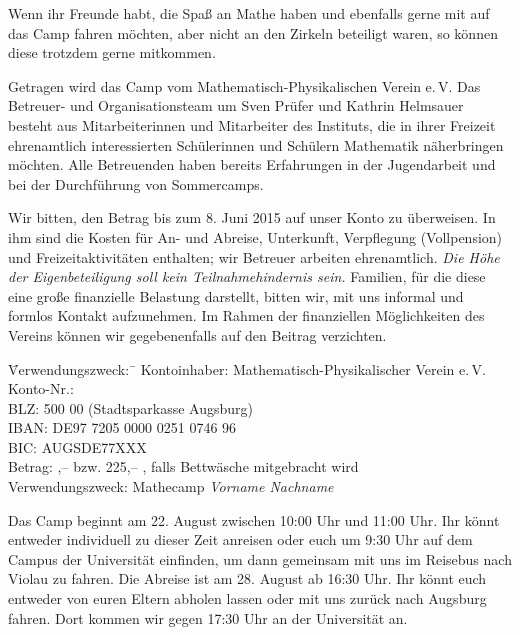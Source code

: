 \documentclass[12pt]{zettel}
\begin{document}
\begin{minipage}{0.44\textwidth}
Wenn ihr Freunde
habt, die Spaß an Mathe haben und ebenfalls gerne mit auf das
Camp fahren möchten, aber nicht an den Zirkeln beteiligt waren, so
können diese trotzdem gerne mitkommen.
\end{minipage}

\newpage

Getragen wird das Camp vom Mathematisch-Physikalischen Verein e.\,V. Das
Betreuer- und Organisationsteam um Sven Prüfer und Kathrin Helmsauer besteht
aus Mitarbeiterinnen und Mitarbeiter des Instituts, die in ihrer Freizeit
ehrenamtlich interessierten Schülerinnen und Schülern Mathematik näherbringen
möchten. Alle Betreuenden haben
bereits Erfahrungen in der Jugendarbeit und bei der Durch\-füh\-rung von
Sommercamps.

Wir bitten, den Betrag bis zum 8. Juni 2015 auf unser Konto zu überweisen.
In ihm sind die Kosten für An- und Abreise, Unterkunft, Verpflegung
(Vollpension) und Freizeitaktivitäten enthalten; wir Betreuer arbeiten
ehrenamtlich. \emph{Die Höhe der Eigenbeteiligung soll kein Teilnahmehindernis sein.}
Familien, für die diese eine große finanzielle Belastung darstellt, bitten wir,
mit uns informal und formlos Kontakt aufzunehmen. Im Rahmen der finanziellen Möglichkeiten des
Vereins können wir gegebenenfalls auf den Beitrag verzichten.

\vspace{-0.7em}
\begin{tabbing}
  \qquad\quad \= Verwendungszweck:\, \= \kill
  \> Kontoinhaber: \> Mathematisch-Physikalischer Verein e.\,V. \\
  \> Konto-Nr.:  \\
  \> BLZ:  500 00 (Stadtsparkasse Augsburg) \\
  \> IBAN: \> DE97 7205 0000 0251 0746 96 \\
  \> BIC: \> AUGSDE77XXX \\
  \> Betrag: ,-- \texteuro{} bzw. 225,-- \texteuro, falls Bettwäsche
  mitgebracht wird \\
  \> Verwendungszweck: \> Mathecamp \emph{Vorname Nachname}
\end{tabbing}
\vspace{-0.7em}

Das Camp beginnt am 22. August zwischen 10:00 Uhr und 11:00 Uhr. Ihr könnt
entweder individuell zu dieser Zeit anreisen oder euch um 9:30 Uhr auf dem Campus der
Universität einfinden, um dann gemeinsam mit uns im Reisebus nach Violau zu fahren.
Die Abreise ist am 28. August ab 16:30 Uhr. Ihr könnt euch entweder von euren
Eltern abholen lassen oder mit uns zurück nach Augsburg fahren. Dort kommen wir
gegen 17:30 Uhr an der Universität an.
\end{document}
